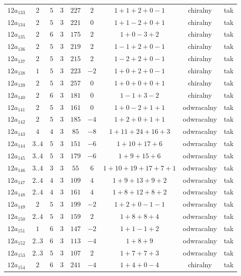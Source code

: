 \begin{longtable}{ccccccccc}
$12a_{133}$ & $2$ & $5$ & $3$ & $227$ & $2$ & $1+1+2+0-1$ & chiralny & tak \\
$12a_{134}$ & $2$ & $5$ & $3$ & $221$ & $0$ & $1+1-2+0+1$ & chiralny & tak \\
$12a_{135}$ & $2$ & $6$ & $3$ & $175$ & $2$ & $1+0-3+2$ & chiralny & tak \\
$12a_{136}$ & $2$ & $5$ & $3$ & $219$ & $2$ & $1-1+2+0-1$ & chiralny & tak \\
$12a_{137}$ & $2$ & $5$ & $3$ & $215$ & $2$ & $1-2+2+0-1$ & chiralny & tak \\
$12a_{138}$ & $1$ & $5$ & $3$ & $223$ & $-2$ & $1+0+2+0-1$ & chiralny & tak \\
$12a_{139}$ & $2$ & $5$ & $3$ & $257$ & $0$ & $1+0+0+0+1$ & chiralny & tak \\
$12a_{140}$ & $2$ & $6$ & $3$ & $181$ & $0$ & $1-1+3-2$ & chiralny & tak \\
$12a_{141}$ & $2$ & $5$ & $3$ & $161$ & $0$ & $1+0-2+1+1$ & odwracalny & tak \\
$12a_{142}$ & $2$ & $5$ & $3$ & $185$ & $-4$ & $1+2+0+1+1$ & odwracalny & tak \\
$12a_{143}$ & $4$ & $4$ & $3$ & $85$ & $-8$ & $1+11+24+16+3$ & odwracalny & tak \\
$12a_{144}$ & $3..4$ & $5$ & $3$ & $151$ & $-6$ & $1+10+17+6$ & odwracalny & tak \\
$12a_{145}$ & $3..4$ & $5$ & $3$ & $179$ & $-6$ & $1+9+15+6$ & odwracalny & tak \\
$12a_{146}$ & $3..4$ & $3$ & $3$ & $55$ & $6$ & $1+10+19+17+7+1$ & odwracalny & tak \\
$12a_{147}$ & $2..4$ & $4$ & $3$ & $109$ & $4$ & $1+9+13+9+2$ & odwracalny & tak \\
$12a_{148}$ & $2..4$ & $4$ & $3$ & $161$ & $4$ & $1+8+12+8+2$ & odwracalny & tak \\
$12a_{149}$ & $2$ & $5$ & $3$ & $199$ & $-2$ & $1+2+0-1-1$ & odwracalny & tak \\
$12a_{150}$ & $2..4$ & $5$ & $3$ & $159$ & $2$ & $1+8+8+4$ & odwracalny & tak \\
$12a_{151}$ & $1$ & $6$ & $3$ & $147$ & $-2$ & $1+1-1+2$ & odwracalny & tak \\
$12a_{152}$ & $2..3$ & $6$ & $3$ & $113$ & $-4$ & $1+8+9$ & odwracalny & tak \\
$12a_{153}$ & $2..3$ & $5$ & $3$ & $107$ & $2$ & $1+7+7+3$ & odwracalny & tak \\
$12a_{154}$ & $2$ & $6$ & $3$ & $241$ & $-4$ & $1+4+0-4$ & chiralny & tak \\

\end{longtable}
